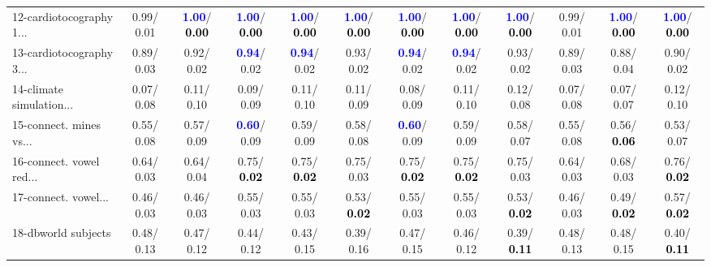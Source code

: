 \begin{table}[h]
\begin{center}
{\begin{tabular}{lc|c|c|c|c|c|c|c|c|c|c}
12-cardiotocography 1... &   0.99/  0.01 & \textcolor{blue}{\textbf{  1.00}}/\textcolor{black}{\textbf{  0.00}} & \textcolor{blue}{\textbf{  1.00}}/\textcolor{black}{\textbf{  0.00}} & \textcolor{blue}{\textbf{  1.00}}/\textcolor{black}{\textbf{  0.00}} & \textcolor{blue}{\textbf{  1.00}}/\textcolor{black}{\textbf{  0.00}} & \textcolor{blue}{\textbf{  1.00}}/\textcolor{black}{\textbf{  0.00}} & \textcolor{blue}{\textbf{  1.00}}/\textcolor{black}{\textbf{  0.00}} & \textcolor{blue}{\textbf{  1.00}}/\textcolor{black}{\textbf{  0.00}} &   0.99/  0.01 & \textcolor{blue}{\textbf{  1.00}}/\textcolor{black}{\textbf{  0.00}} & \textcolor{blue}{\textbf{  1.00}}/\textcolor{black}{\textbf{  0.00}} \\
13-cardiotocography 3... &   0.89/  0.03 &   0.92/  0.02 & \textcolor{blue}{\textbf{  0.94}}/  0.02 & \textcolor{blue}{\textbf{  0.94}}/  0.02 &   0.93/  0.02 & \textcolor{blue}{\textbf{  0.94}}/  0.02 & \textcolor{blue}{\textbf{  0.94}}/  0.02 &   0.93/  0.02 &   0.89/  0.03 &   0.88/  0.04 &   0.90/  0.02 \\
14-climate simulation... &   0.07/  0.08 &   0.11/  0.10 &   0.09/  0.09 &   0.11/  0.10 &   0.11/  0.09 &   0.08/  0.09 &   0.11/  0.10 &   0.12/  0.08 &   0.07/  0.08 &   0.07/  0.07 &   0.12/  0.10 \\ \hline
15-connect. mines vs... &   0.55/  0.08 &   0.57/  0.09 & \textcolor{blue}{\textbf{  0.60}}/  0.09 &   0.59/  0.09 &   0.58/  0.08 & \textcolor{blue}{\textbf{  0.60}}/  0.09 &   0.59/  0.09 &   0.58/  0.07 &   0.55/  0.08 &   0.56/\textcolor{black}{\textbf{  0.06}} &   0.53/  0.07 \\
16-connect. vowel red... &   0.64/  0.03 &   0.64/  0.04 &   0.75/\textcolor{black}{\textbf{  0.02}} &   0.75/\textcolor{black}{\textbf{  0.02}} &   0.75/  0.03 &   0.75/\textcolor{black}{\textbf{  0.02}} &   0.75/\textcolor{black}{\textbf{  0.02}} &   0.75/  0.03 &   0.64/  0.03 &   0.68/  0.03 &   0.76/\textcolor{black}{\textbf{  0.02}} \\
17-connect. vowel... &   0.46/  0.03 &   0.46/  0.03 &   0.55/  0.03 &   0.55/  0.03 &   0.53/\textcolor{black}{\textbf{  0.02}} &   0.55/  0.03 &   0.55/  0.03 &   0.53/\textcolor{black}{\textbf{  0.02}} &   0.46/  0.03 &   0.49/\textcolor{black}{\textbf{  0.02}} &   0.57/\textcolor{black}{\textbf{  0.02}} \\
18-dbworld subjects &   0.48/  0.13 &   0.47/  0.12 &   0.44/  0.12 &   0.43/  0.15 &   0.39/  0.16 &   0.47/  0.15 &   0.46/  0.12 &   0.39/\textcolor{black}{\textbf{  0.11}} &   0.48/  0.13 &   0.48/  0.15 &   0.40/\textcolor{black}{\textbf{  0.11}} \\

\end{tabular}}
\end{center}
\end{table}
